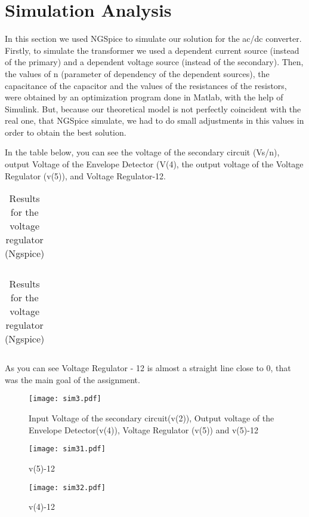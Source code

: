 \section{Simulation Analysis}
\label{simulanal}
In this section we used NGSpice to simulate our solution for the ac/dc converter. Firstly, to simulate the transformer we used a dependent current source (instead of the primary) and a dependent voltage source (instead of the secondary).
Then, the values of n (parameter of dependency of the dependent sources), the capacitance of the capacitor and the values of the resistances of the resistors, were obtained by an optimization program done in Matlab, with the help of Simulink. But, because our theoretical model is not perfectly coincident with the real one, that NGSpice simulate, we had to do small adjustments in this values in order to obtain the best solution.
\par In the table below, you can see the  voltage of the secondary circuit (Vs/n), output Voltage of the Envelope Detector (V(4), the output voltage of the Voltage Regulator (v(5)), and Voltage Regulator-12.
\par \begin{table}[h]
\centering
\begin{tabularx}{0.6\textwidth} {
  | >{\raggedright\arraybackslash}X
  | >{\raggedleft\arraybackslash}X | }
 \hline

\end{tabularx}
\caption{Results for the voltage regulator (Ngspice)}
\end{table}

\begin{table}[h]
\centering
\begin{tabularx}{0.6\textwidth} {
  | >{\raggedright\arraybackslash}X
  | >{\raggedleft\arraybackslash}X | }
 \hline

\end{tabularx}
\caption{Results for the voltage regulator (Ngspice)}
\end{table}

\par As you can see Voltage Regulator - 12 is almost a straight line close to 0, that was the main goal of the assignment.
\begin{figure}[H] \centering
\texttt{[image: sim3.pdf]}
\caption{Input Voltage of the secondary circuit(v(2)), Output voltage of the Envelope Detector(v(4)), Voltage Regulator (v(5)) and v(5)-12}
\label{fig:snat1}
\end{figure}
\begin{figure}[H] \centering
\texttt{[image: sim31.pdf]}
\caption{v(5)-12}
\label{fig:snat2}
\end{figure}
\begin{figure}[H] \centering
\texttt{[image: sim32.pdf]}
\caption{v(4)-12}
\label{fig:snat3}
\end{figure}

